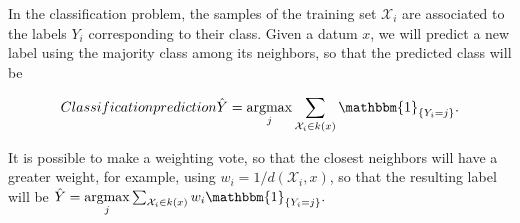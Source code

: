 
In the classification problem, the samples of the training set
$\mathcal{X}_i$ are associated to the labels $Y_i$ corresponding to their class.
Given a datum $x$, we will predict a new label using the majority class among
its neighbors, so that the predicted class will be

\begin{equation}{Classification prediction}
\hat Y =\underset{j}{\operatorname{argmax}} \sum_{\mathcal{X}_i \in k(x)} \mathbbm{1}_{\{ Y_i = j\}}.
\end{equation}

It is possible to make a weighting vote, so that the closest neighbors will have
a greater weight, for example, using $w_i=1/d(\mathcal{X}_i, x)$, so that the
resulting label will be
$
\hat Y = \underset{j}{\operatorname{argmax}}  \sum_{\mathcal{X}_i \in k(x)} w_i\mathbbm{1}_{\{ Y_i = j\}}.
$
